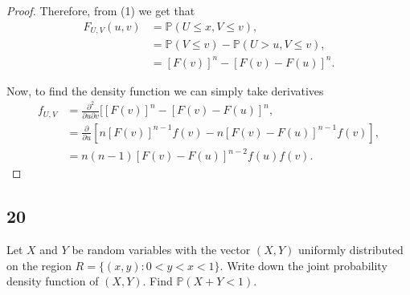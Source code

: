 \documentclass{article}
\newcommand{\partiald}[2]{\frac{\partial #1}{\partial #2}}
\renewcommand{\P}[1]{\mathbb{P}(#1)}
\begin{document}
\begin{proof}
    Therefore, from (1) we get that
    \begin{align*}
        F_{U,V}(u,v) & = \P{U \leq x, V \leq v},             \\
                     & = \P{V \leq v} - \P{U > u, V \leq v}, \\
                     & = [F(v)]^n - [F(v) - F(u)]^n.
    \end{align*}

    Now, to find the density function we can simply take derivatives
    \begin{align*}
        f_{U,V} & = \frac{\partial^2}{\partial u \partial v}[[F(v)]^n - [F(v) - F(u)]^n, \\
                & = \partiald{}{u}[n[F(v)]^{n-1}f(v) - n[F(v)-F(u)]^{n-1}f(v)],          \\
                & = n(n-1)[F(v)-F(u)]^{n-2}f(u)f(v).
    \end{align*}
\end{proof}

\subsection*{20}
Let $X$ and $Y$ be random variables with the vector $(X,Y)$ uniformly
distributed on the region $R= \{(x,y): 0<y<x<1\}$. Write down the joint
probability density function of $(X,Y)$. Find $\P{X+Y < 1}$.
\end{document}
